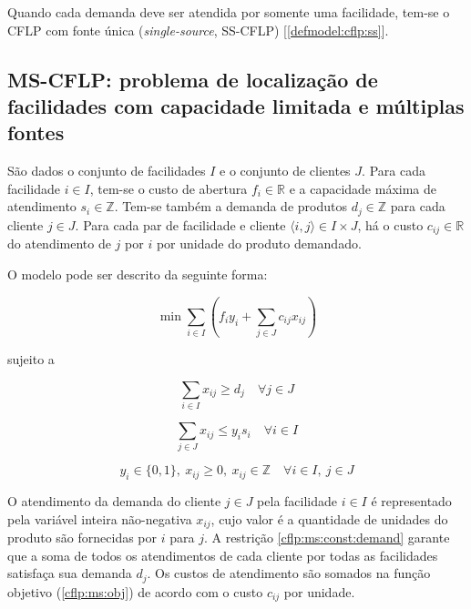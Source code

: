 \documentclass[]{article}
\begin{document}
		Quando cada demanda deve ser atendida por somente uma facilidade, tem-se o CFLP com fonte única (\textit{single-source}, SS-CFLP) [\ref{defmodel:cflp:ss}]. 
		 
		\subsection{MS-CFLP: problema de localização de facilidades com capacidade limitada e múltiplas fontes} \label{defmodel:cflp:ms}
		
			São dados o conjunto de facilidades $I$ e o conjunto de clientes $J$.
			Para cada facilidade $i \in I$, tem-se o custo de abertura $f_i \in \mathbb{R}$ e a capacidade máxima de atendimento $s_i \in \mathbb{Z}$. 
			Tem-se também a demanda de produtos $d_j \in \mathbb{Z}$ para cada cliente $j \in J$.
			Para cada par de facilidade e cliente $\langle i, j \rangle \in I \times J$, há o custo $c_{ij} \in \mathbb{R}$ do atendimento de $j$ por $i$ por unidade do produto demandado.  
			
			O modelo pode ser descrito da seguinte forma:
		
			\begin{equation}
				\label{cflp:ms:obj}		
				\min \sum_{i \in I} 
				(
				f_i y_i + \sum_{j \in J} c_{ij} x_{ij}
				)
			\end{equation}
		
			sujeito a 				
			
			\begin{equation}
				\label{cflp:ms:const:demand}		
				\sum_{i \in I} x_{ij} \ge d_j %
				\quad
				\forall j \in J
			\end{equation}
		
			\begin{equation}
				\label{cflp:ms:const:capacity}		
				\sum_{j \in J} x_{ij} \le y_i s_i 
				\quad
				\forall i \in I
			\end{equation}
			
			\begin{equation}
				\label{cflp:ms:dom:var}		
				y_i \in \{0, 1\}, 
				\ x_{ij} \ge 0, 
				\ x_{ij} \in \mathbb{Z}
				\quad
				\forall i \in I, \ j \in J
			\end{equation}
		
			O atendimento da demanda do cliente $j \in J$ pela facilidade $i \in I$ é representado pela variável inteira não-negativa $x_{ij}$, cujo valor é a quantidade de unidades do produto são fornecidas por $i$ para $j$.
			A restrição \ref{cflp:ms:const:demand} garante que a soma de todos os atendimentos de cada cliente por todas as facilidades satisfaça sua demanda $d_j$.
			Os custos de atendimento são somados na função objetivo (\ref{cflp:ms:obj}) de acordo com o custo $c_{ij}$ por unidade. 		
			
\end{document}

